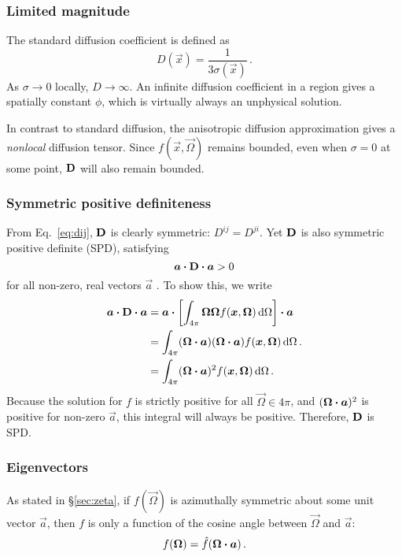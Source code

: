 \subsubsection{Limited magnitude}
The standard diffusion coefficient is defined as
\begin{equation*}
  D(\vec{x}) = \frac{1}{3\sigma(\vec{x})} \,.
\end{equation*}
As $\sigma\to0$ locally, $D\to \infty$. An infinite diffusion coefficient in a
region gives a spatially constant $\phi$, which is virtually always an
unphysical solution.

In contrast to standard diffusion, the anisotropic diffusion approximation gives
a \emph{nonlocal} diffusion tensor. Since $f(\vec{x}, \vec{\Omega})$ remains
bounded, even when $\sigma=0$ at some point, $\mathbf{D}$ will also remain bounded.

\subsubsection{Symmetric positive definiteness}
From Eq.~\eqref{eq:dij}, $\mathbf{D}$ is clearly symmetric: $D^{ij}=D^{ji}$. Yet
$\mathbf{D}$ is also symmetric positive definite (SPD), satisfying
\begin{equation*}
  \bm{a} \bm{\cdot} \mathbf{D} \bm{\cdot} \bm{a} > 0
\end{equation*}
for all non-zero, real vectors $\vec{a}$ \cite{Tre1997}. To show this, we write 
\begin{align*}
  \bm{a} \bm{\cdot} \mathbf{D} \bm{\cdot} \bm{a} &=
  \bm{a} \bm{\cdot} \left[\int_{4\pi} \bm{\Omega} \bm{\Omega}
  f(\bm{x}, \bm{\Omega}) \mathop{}\!\mathrm{d}\Omega\right] \bm{\cdot} \bm{a}
  \\
  &=
  \int_{4\pi} (\bm{\Omega} \bm{\cdot}
  \bm{a}) (\bm{\Omega} \bm{\cdot} \bm{a})
  f(\bm{x}, \bm{\Omega}) \mathop{}\!\mathrm{d}\Omega\,.
  \\
  &=
  \int_{4\pi} (\bm{\Omega} \bm{\cdot} \bm{a})^2
  f(\bm{x}, \bm{\Omega}) \mathop{}\!\mathrm{d}\Omega\,.
\end{align*}
Because the solution for $f$ is strictly positive for all $\vec{\Omega}\in
4\pi$, and $(\bm{\Omega} \bm{\cdot} \bm{a})^2$ is positive for non-zero
$\vec{a}$, this integral will always be positive. Therefore, $\mathbf{D}$ is SPD.

\subsubsection{Eigenvectors}\label{sec:eigenvectors}
As stated in \S\ref{sec:zeta}, if $f(\vec{\Omega})$ is azimuthally
symmetric about some unit vector $\vec{a}$, then $f$ is only a function of the
cosine angle
between $\vec{\Omega}$ and $\vec{a}$:
\begin{equation*}
f(\bm{\Omega}) = \hat f( \bm{\Omega} \bm{\cdot} \bm{a})\,.
\end{equation*}

